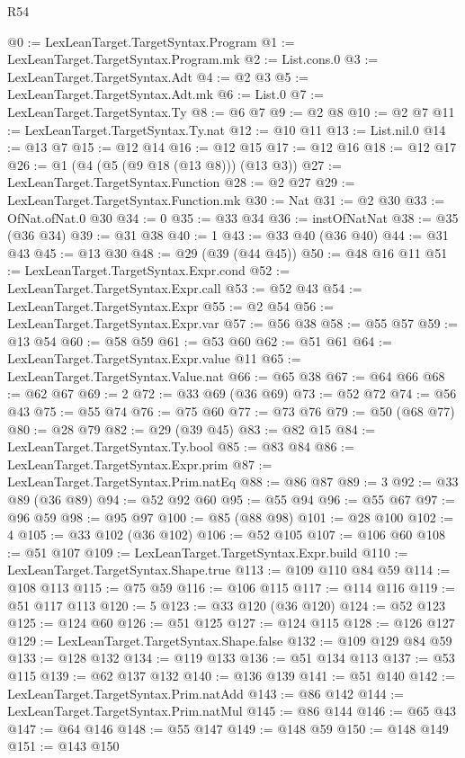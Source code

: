 \begin{lexlean}{R54}
\begin{coremodule}
@0 := LexLeanTarget.TargetSyntax.Program
@1 := LexLeanTarget.TargetSyntax.Program.mk
@2 := List.cons.{0}
@3 := LexLeanTarget.TargetSyntax.Adt
@4 := @2 @3
@5 := LexLeanTarget.TargetSyntax.Adt.mk
@6 := List.{0}
@7 := LexLeanTarget.TargetSyntax.Ty
@8 := @6 @7
@9 := @2 @8
@10 := @2 @7
@11 := LexLeanTarget.TargetSyntax.Ty.nat
@12 := @10 @11
@13 := List.nil.{0}
@14 := @13 @7
@15 := @12 @14
@16 := @12 @15
@17 := @12 @16
@18 := @12 @17
@26 := @1 (@4 (@5 (@9 @18 (@13 @8))) (@13 @3))
@27 := LexLeanTarget.TargetSyntax.Function
@28 := @2 @27
@29 := LexLeanTarget.TargetSyntax.Function.mk
@30 := Nat
@31 := @2 @30
@33 := OfNat.ofNat.{0} @30
@34 := 0
@35 := @33 @34
@36 := instOfNatNat
@38 := @35 (@36 @34)
@39 := @31 @38
@40 := 1
@43 := @33 @40 (@36 @40)
@44 := @31 @43
@45 := @13 @30
@48 := @29 (@39 (@44 @45))
@50 := @48 @16 @11
@51 := LexLeanTarget.TargetSyntax.Expr.cond
@52 := LexLeanTarget.TargetSyntax.Expr.call
@53 := @52 @43
@54 := LexLeanTarget.TargetSyntax.Expr
@55 := @2 @54
@56 := LexLeanTarget.TargetSyntax.Expr.var
@57 := @56 @38
@58 := @55 @57
@59 := @13 @54
@60 := @58 @59
@61 := @53 @60
@62 := @51 @61
@64 := LexLeanTarget.TargetSyntax.Expr.value @11
@65 := LexLeanTarget.TargetSyntax.Value.nat
@66 := @65 @38
@67 := @64 @66
@68 := @62 @67
@69 := 2
@72 := @33 @69 (@36 @69)
@73 := @52 @72
@74 := @56 @43
@75 := @55 @74
@76 := @75 @60
@77 := @73 @76
@79 := @50 (@68 @77)
@80 := @28 @79
@82 := @29 (@39 @45)
@83 := @82 @15
@84 := LexLeanTarget.TargetSyntax.Ty.bool
@85 := @83 @84
@86 := LexLeanTarget.TargetSyntax.Expr.prim
@87 := LexLeanTarget.TargetSyntax.Prim.natEq
@88 := @86 @87
@89 := 3
@92 := @33 @89 (@36 @89)
@94 := @52 @92 @60
@95 := @55 @94
@96 := @55 @67
@97 := @96 @59
@98 := @95 @97
@100 := @85 (@88 @98)
@101 := @28 @100
@102 := 4
@105 := @33 @102 (@36 @102)
@106 := @52 @105
@107 := @106 @60
@108 := @51 @107
@109 := LexLeanTarget.TargetSyntax.Expr.build
@110 := LexLeanTarget.TargetSyntax.Shape.true
@113 := @109 @110 @84 @59
@114 := @108 @113
@115 := @75 @59
@116 := @106 @115
@117 := @114 @116
@119 := @51 @117 @113
@120 := 5
@123 := @33 @120 (@36 @120)
@124 := @52 @123
@125 := @124 @60
@126 := @51 @125
@127 := @124 @115
@128 := @126 @127
@129 := LexLeanTarget.TargetSyntax.Shape.false
@132 := @109 @129 @84 @59
@133 := @128 @132
@134 := @119 @133
@136 := @51 @134 @113
@137 := @53 @115
@139 := @62 @137 @132
@140 := @136 @139
@141 := @51 @140
@142 := LexLeanTarget.TargetSyntax.Prim.natAdd
@143 := @86 @142
@144 := LexLeanTarget.TargetSyntax.Prim.natMul
@145 := @86 @144
@146 := @65 @43
@147 := @64 @146
@148 := @55 @147
@149 := @148 @59
@150 := @148 @149
@151 := @143 @150

\end{coremodule}
\end{lexlean}
